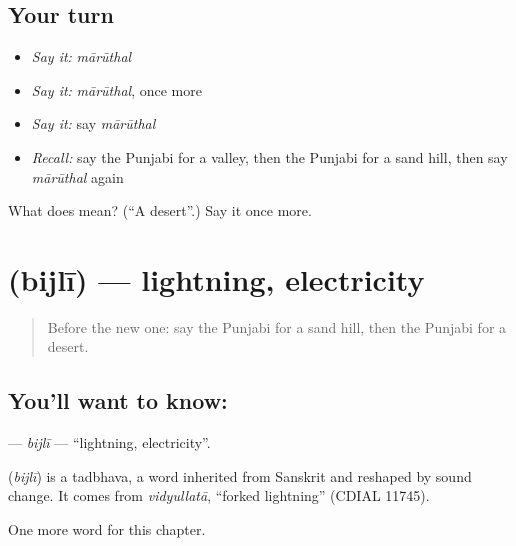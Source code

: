 \subsection*{Your turn}
\begin{itemize}
\raggedright
  \item \emph{Say it:} \emph{mārūthal}
  \item \emph{Say it:} \emph{mārūthal}, once more
  \item \emph{Say it:} say \emph{mārūthal}
  \item \emph{Recall:} say the Punjabi for a valley, then the Punjabi for a sand hill, then say \emph{mārūthal} again
\end{itemize}

\begin{tcolorbox}[breakable,colback=teal!4,colframe=teal!35!black,title={Before you move on}]
What does  mean? (\textquotedblleft{}A desert\textquotedblright{}.) Say it once more.
\end{tcolorbox}
\section[\texorpdfstring{\pa{ਬਿਜਲੀ} (bijlī)}{ਬਿਜਲੀ (bijlī)}]{ (bijlī) — lightning, electricity}

\label{lesson:PA-C128-bijli}



\begin{quote}
Before the new one: say the Punjabi for a sand hill, then the Punjabi for a desert.
\end{quote}

\subsection*{You'll want to know: }
\textbf{} — \emph{bijlī} — \textquotedblleft{}lightning, electricity\textquotedblright{}.

\begin{cousinweb}
\textbf{} (\emph{bijlī}) is a tadbhava, a word inherited from Sanskrit and reshaped by sound change. It comes from \emph{vidyullatā}, \textquotedblleft{}forked lightning\textquotedblright{} (CDIAL 11745).
\end{cousinweb}

\begin{grammarlens}[title={What you've built}]
One more word for this chapter.
\end{grammarlens}

